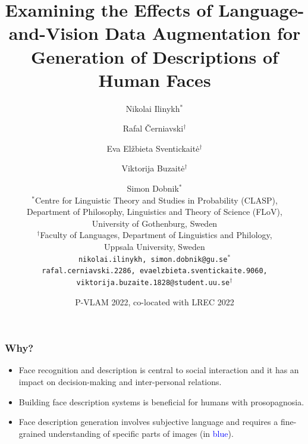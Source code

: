 \documentclass[aspectratio=1610]{beamer} %
\title{Examining the Effects of Language-and-Vision Data Augmentation for Generation of Descriptions of Human Faces}
\author{
Nikolai Ilinykh$^{\ast}$ \and Rafal Černiavski$^{\dagger}$ \and Eva Elžbieta Sventickaitė$^{\dagger}$ \\ \and Viktorija Buzaitė$^{\dagger}$ \and Simon Dobnik$^{\ast}$ \\
	\vspace{.2cm}
        \small $^{\ast}$Centre for Linguistic Theory and Studies in Probability (CLASP), \\
        Department of Philosophy, Linguistics and Theory of Science (FLoV), \\
        University of Gothenburg, Sweden \\
	$^{\dagger}$Faculty of Languages, Department of Linguistics and Philology, \\ Uppsala University, Sweden \\
	\vspace{.2cm}
	\texttt{nikolai.ilinykh, simon.dobnik@gu.se}$^{\ast}$ \\
	\texttt{rafal.cerniavski.2286, evaelzbieta.sventickaite.9060, viktorija.buzaite.1828@student.uu.se}$^{\dagger}$ \\
      }
\date{P-VLAM 2022, co-located with LREC 2022}
\begin{document}
\frame[plain]{\titlepage}



\begin{frame}
\frametitle{Why?}

\begin{itemize}

\vspace{.7cm}

\item Face recognition and description is central to social interaction and it has an impact on decision-making and inter-personal relations.
\pause
\item Building face description systems is beneficial for humans with prosopagnosia.
\pause
\item Face description generation involves subjective language and requires a fine-grained understanding of specific parts of images (in \textcolor{blue}{blue}).

\end{itemize}


\end{frame}
\end{document}
